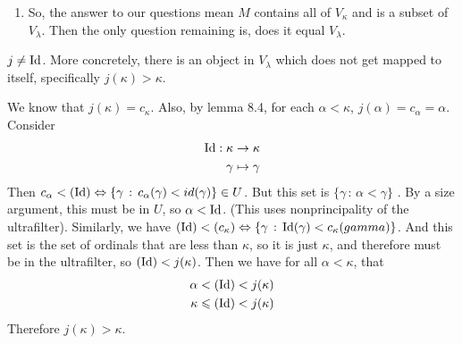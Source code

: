 \documentclass{article}
\begin{document}
\endproof 
\begin{enumerate}
    \item[(4)] So, the answer to our questions mean $M$ contains all of $V_{\kappa}$ and is a subset of $V_{\lambda}$. Then the only question remaining is, does it equal $V_{\lambda}$.
\end{enumerate}
\newlec 
\begin{fancylem}{}
    $j \neq \operatorname{Id}$. More concretely, there is an object in $V_{\lambda}$ which does not get mapped to itself, specifically $j(\kappa) > \kappa$.
\end{fancylem}
\proof We know that $j(\kappa) = c_{\kappa}$. Also, by lemma 8.4, for each $\alpha < \kappa$, $j(\alpha)=c_{\alpha}=\alpha$. Consider \begin{align*}
    \operatorname{Id} : \kappa &\to \kappa\\
    \gamma &\mapsto \gamma
\end{align*}
Then $c_{\alpha}<(\operatorname{Id}) \Leftrightarrow \{\gamma \, : \, c_{\alpha}(\gamma) < id(\gamma) \} \in U$. But this set is $\{\gamma \, : \, \alpha <\gamma \}$ . By a size argument, this must be in $U$, so $\alpha < \operatorname{Id}$. (This uses nonprincipality of the ultrafilter). \gap 
Similarly, we have $(\operatorname{Id}) < (c_{\kappa}) \Leftrightarrow \{\gamma \, : \, \operatorname{Id}(\gamma) < c_{\kappa}(gamma)\}$. And this set is the set of ordinals that are less than $\kappa$, so it is just $\kappa$, and therefore must be in the ultrafilter, so $(\operatorname{Id}) < j(\kappa)$.\gap 
Then we have for all $\alpha < \kappa$, that \begin{align*}
    \alpha < (\operatorname{Id}) &< j(\kappa)\\
    \kappa \leqslant (\operatorname{Id}) &<j(\kappa)
\end{align*}
Therefore $j(\kappa) > \kappa$. \endproof 
\end{document}
